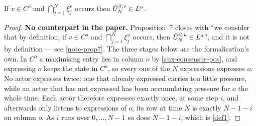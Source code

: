 \begin{lemma}
  \label{aux-consensus-ladder}
  \leanok
  If $v \in C^o$ and $\bigcap_{j=1}^N \xi_j^v$ occurs then $\tilde{U}^{\beta,v}_N \in L^o$.
\end{lemma}
\begin{proof}
  \leanok
  \textbf{No counterpart in the paper.} Proposition~7 closes with ``we consider
  that by definition, if $v \in C^o$ and $\bigcap_{j=1}^N \xi_j^u$ occurs, then
  $\tilde{U}^{\beta,u}_N \in L^o$'', and it is not by definition --- see
  \ref{note-prop7}.  The three stages below are the formalisation's own.  In
  $C^o$ a maximising entry lies in column $o$ by \ref{aux-consensus-pos}, and
  expressing $o$ keeps the state in $C^o$, so every one of the $N$ expressions
  expresses $o$.  No actor expresses twice: one that already expressed carries
  too little pressure, while an actor that has not expressed has been
  accumulating pressure for $o$ the whole time.  Each actor therefore expresses
  exactly once, at some step $i$, and afterwards only listens to expressions of
  $o$; its row at time $N$ is exactly $N-1-i$ on column $o$.  As $i$ runs over
  $0, \dots, N-1$ so does $N-1-i$, which is \ref{def1}.
\end{proof}

